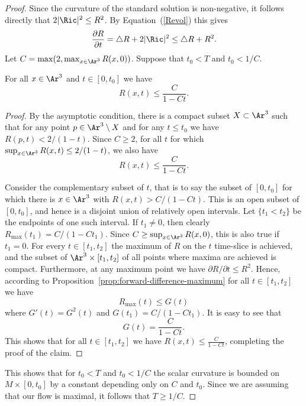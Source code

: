 \begin{proof}
Since the curvature of the standard solution is non-negative, it
follows directly that $2|\Ric|^2\le R^2$. By
Equation~(\ref{Revol}) this gives
$$\frac{\partial R}{\partial t}=\triangle R+2|\Ric|^2\le \triangle
R+R^2.$$ Let $C=\max(2,\max_{x\in \Ar^3}R(x,0))$. Suppose
that $t_0< T$ and $t_0<1/C$.

\begin{claim}
\label{claim:standard-flow-curvature-bound}
For all $x\in \Ar^3$ and $t\in [0,t_0]$ we have
$$R(x,t)\le \frac{C}{1-Ct}.$$
\end{claim}


\begin{proof}
By the asymptotic condition, there is a compact subset $X\subset
\Ar^3$ such that for any point $p\in \Ar^3\setminus X$ and for any
$t\le t_0$ we have $R(p,t)<2/(1-t)$. Since $C\ge 2$, for all $t$ for
which $\sup_{x\in \Ar^3}R(x,t)\le 2/(1-t)$,  we also have
$$R(x,t)\le \frac{C}{1-Ct}.$$

Consider the complementary subset of $t$, that is to say the subset
of $[0,t_0]$ for which there is $x\in \Ar ^3$ with
$R(x,t)>C/(1-Ct)$. This is an open subset of $[0,t_0]$, and hence is
a disjoint union of relatively open intervals. Let $\{t_1<t_2\}$ be
the endpoints of one such interval. If $t_1\not=0$, then clearly
$R_{\max}(t_1)=C/(1-Ct_1)$. Since $C\ge \sup_{x\in
\Ar^3}R(x,0)$, this is also true if $t_1=0$. For every  $t\in
[t_1,t_2]$ the maximum of $R$ on the $t$ time-slice is achieved, and
the subset of $\Ar^3\times [t_1,t_2]$ of all points where maxima are
achieved is compact. Furthermore, at any maximum point we have
$\partial R/\partial t\le R^2$. Hence, according to
Proposition~\ref{prop:forward-difference-maximum} for all $t\in [t_1,t_2]$ we have
$$R_{\max}(t)\le G(t)$$
where $G'(t)=G^2(t)$ and $G(t_1)=C/(1-Ct_1)$. It is easy to see that
$$G(t)= \frac{C}{1-Ct}.$$
This shows that for all $t\in [t_1,t_2]$ we have $R(x,t)\le
\frac{C}{1-Ct}$, completing the proof of the claim.
\end{proof}


This shows that for $t_0<T$ and $t_0<1/C$ the scalar curvature is
bounded on $M\times [0,t_0]$ by a constant depending only on $C$ and
$t_0$. Since we are assuming that our flow is maximal, it follows
that $T\ge 1/C$.



\end{proof}
